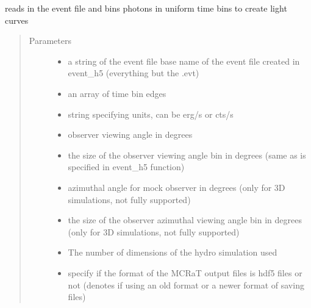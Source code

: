 \documentclass[letterpaper,10pt,english]{sphinxmanual}
\begin{document}
\begin{fulllineitems}
\label{\detokenize{mclib:mclib.lcur}}
reads in the event file and bins photons in uniform time bins to create light curves
\begin{quote}\begin{description}
\item[{Parameters}] \leavevmode\begin{itemize}
\item {} 
 \textendash{} a string of the event file base name of the event file created in event\_h5 (everything but the .evt)

\item {} 
 \textendash{} an array of time bin edges

\item {} 
 \textendash{} string specifying units, can be erg/s or cts/s

\item {} 
 \textendash{} observer viewing angle in degrees

\item {} 
 \textendash{} the size of the observer viewing angle bin in degrees (same as is specified in event\_h5 function)

\item {} 
 \textendash{} azimuthal angle for mock observer in degrees (only for 3D simulations, not fully supported)

\item {} 
 \textendash{} the size of the observer azimuthal viewing angle bin in degrees (only for 3D simulations, not fully
supported)

\item {} 
 \textendash{} The number of dimensions of the hydro simulation used

\item {} 
 \textendash{} specify if the format of the MCRaT output files is hdf5 files or not (denotes if using an old format or
a newer format of saving files)


\end{itemize}
\end{description}
\end{quote}
\end{fulllineitems}
\end{document}
